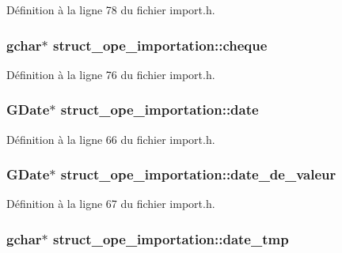 Définition à la ligne 78 du fichier import.h.

\subsubsection[{cheque}]{\setlength{\rightskip}{0pt plus 5cm}gchar$\ast$ {\bf struct\_\-ope\_\-importation::cheque}}\label{structstruct__ope__importation_a9bf5717da655fe4e25e8c4006584d5de}


Définition à la ligne 76 du fichier import.h.

\subsubsection[{date}]{\setlength{\rightskip}{0pt plus 5cm}GDate$\ast$ {\bf struct\_\-ope\_\-importation::date}}\label{structstruct__ope__importation_a98d11b6875040c7783b12abdedc6f5a0}


Définition à la ligne 66 du fichier import.h.

\subsubsection[{date\_\-de\_\-valeur}]{\setlength{\rightskip}{0pt plus 5cm}GDate$\ast$ {\bf struct\_\-ope\_\-importation::date\_\-de\_\-valeur}}\label{structstruct__ope__importation_a87810cbd10a0ce882486b602d9de8f36}


Définition à la ligne 67 du fichier import.h.

\subsubsection[{date\_\-tmp}]{\setlength{\rightskip}{0pt plus 5cm}gchar$\ast$ {\bf struct\_\-ope\_\-importation::date\_\-tmp}}\label{structstruct__ope__importation_aaa2c862b15a3b083f8fcfdec9be576b4}


